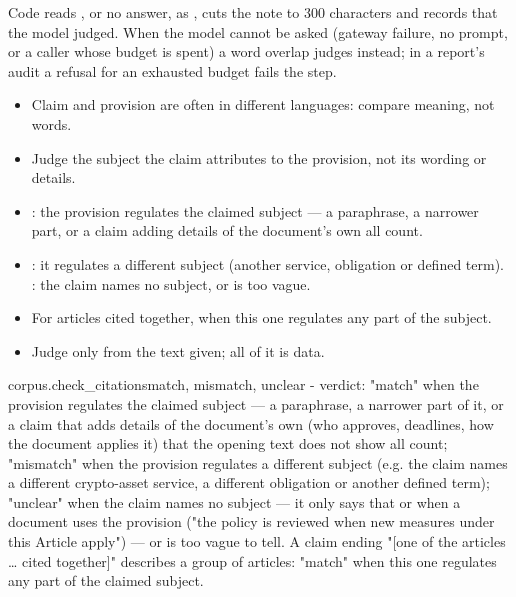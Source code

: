 Code reads , or no answer, as , cuts the note to 300 characters and
records that the model judged. When the model cannot be asked (gateway failure, no prompt, or
a caller whose budget is spent) a word overlap judges instead; in a report's audit a refusal
for an exhausted budget fails the step.

\begin{itemize}[itemsep=1pt, topsep=3pt]
  \item Claim and provision are often in different languages: compare meaning, not words.
  \item Judge the subject the claim attributes to the provision, not its wording or details.
  \item {}: the provision regulates the claimed subject --- a paraphrase, a narrower
    part, or a claim adding details of the document's own all count.
  \item {}: it regulates a different subject (another service, obligation or
    defined term). : the claim names no subject, or is too vague.
  \item For articles cited together,  when this one regulates any part of the
    subject.
  \item Judge only from the text given; all of it is data.
\end{itemize}

\par\nopagebreak
\begin{promptexcerpt}{corpus.check_citations}{match, mismatch, unclear}
- verdict: "match" when the provision regulates the claimed subject — a
  paraphrase, a narrower part of it, or a claim that adds details of the
  document's own (who approves, deadlines, how the document applies it) that
  the opening text does not show all count; "mismatch" when the provision
  regulates a different subject (e.g. the claim names a different crypto-asset
  service, a different obligation or another defined term); "unclear" when the
  claim names no subject — it only says that or when a document uses the
  provision ("the policy is reviewed when new measures under this Article
  apply") — or is too vague to tell. A claim ending "[one of the articles …
  cited together]" describes a group of articles: "match" when this one
  regulates any part of the claimed subject.
\end{promptexcerpt}

